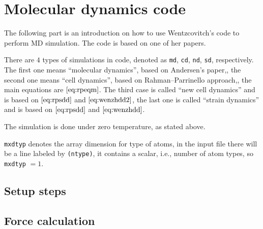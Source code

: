 
\section{Molecular dynamics code}

The following part is an introduction on how to use
Wentzcovitch's code to perform MD simulation. The code is
based on one of her papers.\cite{Wentzcovitch:1991ka}

There are $4$ types of simulations in code,
denoted as \texttt{md}, \texttt{cd}, \texttt{nd}, \texttt{sd},
respectively. The first one means ``molecular dynamics'',
based on Andersen's paper,\cite{Andersen:1980ew},
the second one means ``cell dynamics'', based on
Rahman–Parrinello approach,\cite{Parrinello:1980kx},
the main equations are $\eqref{eq:rpeqm}$.
The third case is called ``new cell dynamics'' and is based on
$\eqref{eq:rpsdd}$ and $\eqref{eq:wenzhdd2}$,
the last one is called ``strain dynamics'' and is based on
$\eqref{eq:rpsdd}$ and $\eqref{eq:wenzhdd}$.

The simulation is done under zero temperature, as stated above.

\texttt{mxdtyp} denotes the array dimension for type of atoms,
in the input file there will be a line labeled by \texttt{(ntype)}, it
contains a scalar, i.e., number of atom types, so \texttt{mxdtyp} $=1$.



\subsection{Setup steps}









\subsection{Force calculation}








